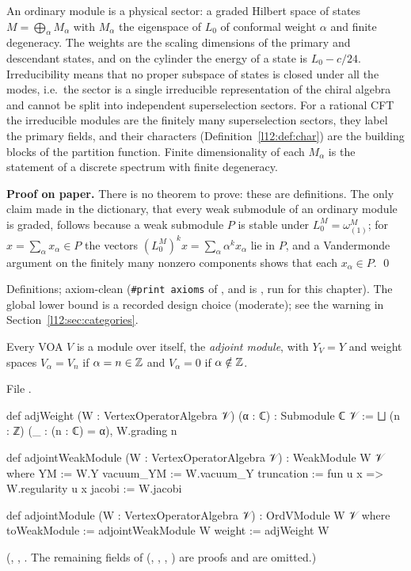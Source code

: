 \begin{physics}
An ordinary module is a physical sector: a graded Hilbert space of states $M=\bigoplus_\alpha M_\alpha$ with $M_\alpha$ the
eigenspace of $L_0$ of conformal weight $\alpha$ and finite degeneracy. The weights are the scaling dimensions of the
primary and descendant states, and on the cylinder the energy of a state is $L_0-c/24$. Irreducibility means that no proper
subspace of states is closed under all the modes, i.e.\ the sector is a single irreducible representation of the chiral
algebra and cannot be split into independent superselection sectors. For a rational CFT the irreducible modules are the finitely many
superselection sectors, they label the primary fields, and their characters (Definition~\ref{l12:def:char}) are the building blocks of the partition
function. Finite dimensionality of each $M_\alpha$ is the statement of a discrete spectrum with finite degeneracy.
\end{physics}

\textbf{Proof on paper.} There is no theorem to prove: these are definitions. The only claim made in the dictionary, that every weak
submodule of an ordinary module is graded, follows because a weak submodule $P$ is stable under $L_0^M=\omega^M_{(1)}$; for
$x=\sum_\alpha x_\alpha\in P$ the vectors $(L_0^M)^kx = \sum_\alpha\alpha^kx_\alpha$ lie in $P$, and a Vandermonde argument on the
finitely many nonzero components shows that each $x_\alpha\in P$. \qed

\begin{status}
Definitions; axiom-clean (\texttt{\#print axioms} of ,  and
 is \lean{[propext, Classical.}\allowbreak{}\allowbreak\lean{sound]}, run for this chapter).
The global lower bound is a recorded design choice (moderate); see the warning in Section~\ref{l12:sec:categories}.
\end{status}

\begin{definition}\label{l12:def:adjoint}
Every VOA $V$ is a module over itself, the \emph{adjoint module}, with $Y_V = Y$ and weight spaces $V_\alpha = V_n$ if $\alpha = n\in{\mathbb{Z}}$ and
$V_\alpha = 0$ if $\alpha\notin{\mathbb{Z}}$.
\end{definition}
\noindent File .
\begin{leancode}
def adjWeight (W : VertexOperatorAlgebra 𝒱) (α : ℂ) : Submodule ℂ 𝒱 :=
  ⨆ (n : ℤ) (_ : (n : ℂ) = α), W.grading n

def adjointWeakModule (W : VertexOperatorAlgebra 𝒱) : WeakModule W 𝒱 where
  YM := W.Y
  vacuum_YM := W.vacuum_Y
  truncation := fun u x => W.regularity u x
  jacobi := W.jacobi

def adjointModule (W : VertexOperatorAlgebra 𝒱) : OrdVModule W 𝒱 where
  toWeakModule := adjointWeakModule W
  weight := adjWeight W
\end{leancode}
(, , . The remaining fields of 
(, , , ) are proofs and are omitted.)

